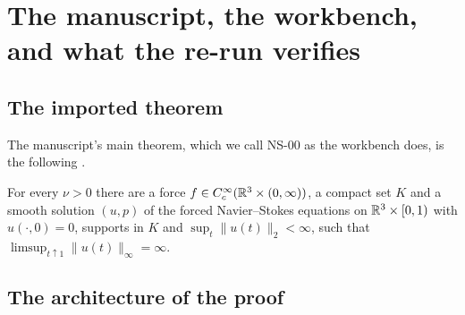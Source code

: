 \section{The manuscript, the workbench, and what the re-run verifies}\label{sec:setting}

\subsection{The imported theorem}

The manuscript's main theorem, which we call NS-00 as the workbench does, is the following \cite[Theorem~1.1]{OpenAINS}.

\begin{theorem}\label{thm:ns00}
For every $\nu>0$ there are a force $f\in C_c^\infty(\mathbb{R}^3\times(0,\infty))$, a compact set $K$ and a smooth solution $(u,p)$ of the forced Navier--Stokes equations on $\mathbb{R}^3\times[0,1)$ with $u(\cdot,0)=0$, supports in $K$ and $\sup_t\|u(t)\|_2<\infty$, such that $\limsup_{t\uparrow1}\|u(t)\|_\infty=\infty$.
\end{theorem}

\subsection{The architecture of the proof}

